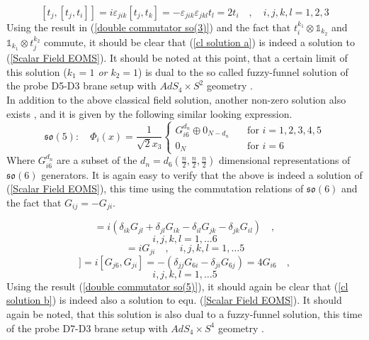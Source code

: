%
%
\begin{equation}\label{double commutator so(3)}
[t_j, [t_j, t_i]] = i \varepsilon_{jik} [t_j, t_k]
=
-\varepsilon_{jik} \varepsilon_{jkl} t_l
=
2 t_i
%
\quad , \quad
%
i,j,k,l = 1,2,3
\end{equation}
%
%
Using the result in (\ref{double commutator so(3)}) and the fact that $t_i^{k_1} \otimes \mathbb{1}_{k_2}$ and $\mathbb{1}_{k_1} \otimes t_{j}^{k_2}$ commute, it should be clear that (\ref{cl solution a}) is indeed a solution to (\ref{Scalar Field EOMS}). It should be noted at this point, that a certain limit of this solution (\textit{$k_1 = 1$ or $k_2 = 1$}) is dual to the so called fuzzy-funnel solution of the probe D5-D3 brane setup with $AdS_4 \times S^2$ geometry \cite{fuzzy-funnel solution}.\\
In addition to the above classical field solution, another non-zero solution also exists \cite{One-point functions in D3-D7 SO(5)}, and it is given by the following similar looking expression.
%
%
\begin{equation}\label{cl solution b}
\mathfrak{so}(5) :
%
\quad
%
\Phi_i(x)
=
\frac{1}{\sqrt{2} x_3}
	\begin{cases}
		G_{i6}^{d_n} \oplus 0_{N-d_n}
		& \quad \text{for } i = 1,2,3,4,5 \\
		
    	0_{N}
    	& \quad \text{for } i = 6
  \end{cases}
\end{equation}
%
%
Where $G_{i6}^{d_n}$ are a subset of the $d_n = d_6 \left(\frac{n}{2},\frac{n}{2},\frac{n}{2} \right)$ dimensional representations of $\mathfrak{so}(6)$ generators. It is again easy to verify that the above is indeed a solution of (\ref{Scalar Field EOMS}), this time using the commutation relations of $\mathfrak{so}(6)$ and the fact that $G_{ij} = -G_{ji}$.

\newpage
%
%
\begin{equation*}
[G_{ij}, G_{kl}] = i \left(
\delta_{ik} G_{jl}
+ \delta_{jl} G_{ik}
- \delta_{il} G_{jk}
- \delta_{jk} G_{il}
\right)
%
\quad ,
\end{equation*}
%
%
\begin{equation}
i,j,k,l = 1, \ldots 6
\end{equation}
%
%
\begin{equation}
[G_{j6}, G_{i6}] = i G_{ji}
%
\quad , \quad
%
i,j,k,l = 1, \ldots 5
\end{equation}
%
%
\begin{equation*}
[G_{j6}, [G_{j6}, G_{i6}]] = i [G_{j6}, G_{ji}]
=
-\left(
\delta_{jj} G_{6i}
- \delta_{ji} G_{6j}
\right)
=
4 G_{i6}
%
\quad ,
\end{equation*}
%
%
\begin{equation}\label{double commutator so(5)}
i,j,k,l = 1, \ldots 5
\end{equation}
%
%
Using the result (\ref{double commutator so(5)}), it should again be clear that (\ref{cl solution b}) is indeed also a solution to equ. (\ref{Scalar Field EOMS}). It should again be noted, that this solution is also dual to a fuzzy-funnel solution, this time of the probe D7-D3 brane setup with $AdS_4 \times S^4$ geometry \cite{fuzzy-funnel solution D7}.

